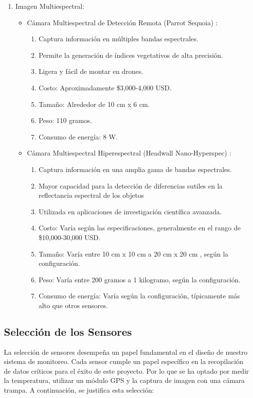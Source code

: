 \begin{enumerate}
\item Imagen Multiespectral:
\begin{itemize}
    \item Cámara Multiespectral de Detección Remota (Parrot Sequoia) \cite{100}:
\begin{enumerate}
        \item Captura información en múltiples bandas espectrales.
        \item Permite la generación de índices vegetativos de alta precisión.
        \item Ligera y fácil de montar en drones.
        \item Costo: Aproximadamente \$3,000-4,000 USD.
        \item Tamaño: Alrededor de 10 cm x 6 cm.
        \item Peso: 110 gramos.
        \item Consumo de energía: 8 W.
\end{enumerate}
    \item Cámara Multiespectral Hiperespectral (Headwall Nano-Hyperspec) \cite{101}:
\begin{enumerate}
        \item Captura información en una amplia gama de bandas espectrales.
        \item Mayor capacidad para la detección de diferencias sutiles en la reflectancia espectral de los objetos
        \item Utilizada en aplicaciones de investigación científica avanzada.
        \item Costo: Varía según las especificaciones, generalmente en el rango de \$10,000-30,000 USD.
        \item Tamaño: Varía entre 10 cm x 10 cm a 20 cm x 20 cm , según la configuración.
        \item Peso: Varía entre 200 gramos a 1 kilogramo, según la configuración.
        \item Consumo de energía: Varía según la configuración, típicamente más alto que otros sensores.
\end{enumerate}

\end{itemize}
\end{enumerate}
    
\subsection{Selección de los Sensores}
La selección de sensores desempeña un papel fundamental en el diseño de nuestro sistema de monitoreo. Cada sensor cumple un papel específico en la recopilación de datos críticos para el éxito de este proyecto. Por lo que se ha optado por medir la temperatura, utilizar un módulo GPS y la captura de imagen con una cámara trampa. A continuación, se justifica esta selección:

